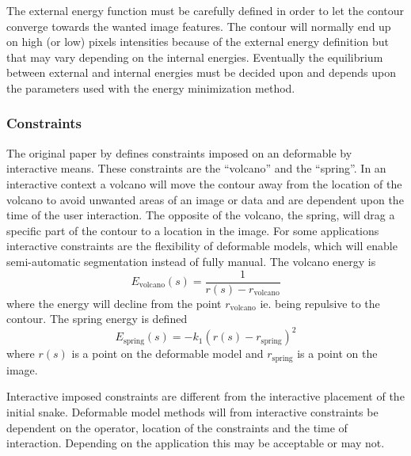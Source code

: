 The external energy function must be carefully defined in order to let
the contour converge towards the wanted image features. The contour
will normally end up on high (or low) pixels intensities because of
the external energy definition but that may vary depending on the
internal energies. Eventually the equilibrium between external and
internal energies must be decided upon and depends upon the parameters
used with the energy minimization method.


\subsubsection{Constraints}
\label{sec:constraints}

The original paper by \citep{kass88} defines constraints imposed on an
deformable by interactive means. These constraints are the ``volcano''
and the ``spring''. In an interactive context a volcano will move the
contour away from the location of the volcano to avoid unwanted areas
of an image or data and are dependent upon the time of the user
interaction. The opposite of the volcano, the spring, will drag a
specific part of the contour to a location in the image. For some
applications interactive constraints are the flexibility of deformable
models, which will enable semi-automatic segmentation instead of fully
manual. The volcano energy is
\begin{equation}
  \label{eq:energy-volcano}
  E_{\text{volcano}}(s) = \frac{1}{r(s) - r_{\text{volcano}}}
\end{equation}
where the energy will decline from the point $r_{\text{volcano}}$
ie. being repulsive to the contour.
The spring energy is defined
\begin{equation}
  \label{eq:energy-spring}
  E_{\text{spring}}(s) = -k_1(r(s) - r_{\text{spring}})^2
\end{equation}
where $r(s)$ is a point on the deformable model and
$r_{\text{spring}}$ is a point on the image. 

Interactive imposed constraints are different from the interactive
placement of the initial snake. Deformable model methods will from
interactive constraints be dependent on the operator, location of the
constraints and the time of interaction. Depending on the application
this may be acceptable or may not.

